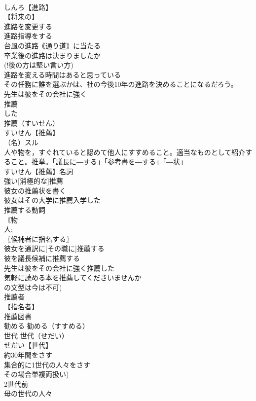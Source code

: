 \documentclass[8pt]{extreport}
\begin{document}
\begin{CJK}{UTF8}{min}
\\	しんろ【進路】
\\	【将来の】
\\	進路を変更する
\\	進路指導をする
\\	台風の進路｟通り道｠に当たる
\\	卒業後の進路は決まりましたか
\\	(!後の方は堅い言い方)
\\	進路を変える時間はあると思っている
\\	その任務に誰を選ぶかは、社の今後10年の進路を決めることになるだろう。
\\	先生は彼をその会社に強く
\\	推薦
\\	した
\\	推薦（すいせん）
\\	すいせん【推薦】
\\	（名）スル
\\	人や物を，すぐれていると認めて他人にすすめること。適当なものとして紹介すること。推挙。「議長に―する」「参考書を―する」「―状」
\\	すいせん【推薦】名詞
\\	強い[消極的な]推薦
\\	彼女の推薦状を書く
\\	彼女はその大学に推薦入学した
\\	推薦する動詞
\\	〘物
\\	人; 
\\	〖候補者に指名する〗
\\	彼女を通訳に[その職に]推薦する
\\	彼を議長候補に推薦する
\\	先生は彼をその会社に強く推薦した
\\	気軽に読める本を推薦してくださいませんか
\\	の文型は今は不可)
\\	推薦者
\\	【指名者】
\\	推薦図書
\\	勧める		勧める（すすめる）
\\	世代		世代（せだい）
\\	せだい【世代】
\\	約30年間をさす
\\	集合的に1世代の人々をさす
\\	その場合単複両扱い)
\\	2世代前
\\	母の世代の人々

\end{CJK}
\end{document}
